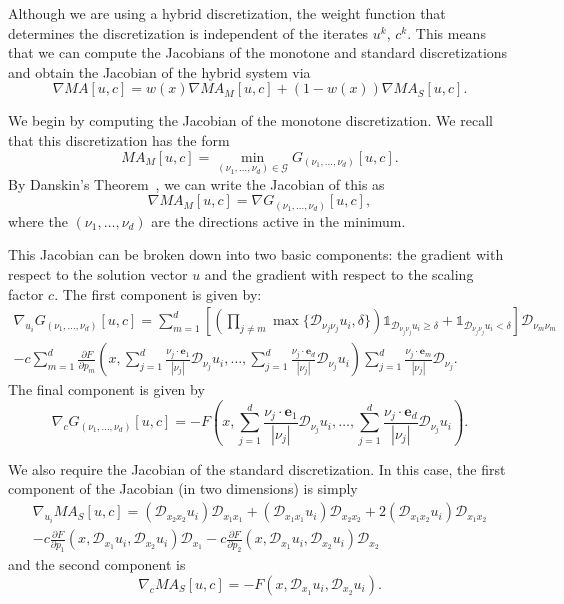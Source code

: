 \documentclass{amsart}
\theoremstyle{lemma}
\theoremstyle{remark}
\begin{document}
Although we are using a hybrid discretization, the weight function that determines the discretization is independent of the iterates $u^k$, $c^k$.  This means that we can compute the Jacobians of the monotone and standard discretizations and obtain the Jacobian of the hybrid system via
\[ \nabla MA[u,c] = w(x) \nabla MA_M[u,c] + (1-w(x)) \nabla MA_S[u,c]. \]

We begin by computing the Jacobian of the monotone discretization.  We recall that this discretization has the form
\[ MA_M[u,c] = \min\limits_{(\nu_1,\ldots,\nu_d)\in{\mathcal{G}}} G_{(\nu_1,\ldots,\nu_d)}[u,c]. \]
By Danskin's Theorem~\cite{Bertsekas}, we can write the Jacobian of this as
\[ \nabla MA_M[u,c] = \nabla G_{(\nu_1,\ldots,\nu_d)}[u,c],\]
where the $(\nu_1,\ldots,\nu_d)$ are the directions active in the minimum.

This Jacobian can be broken down into two basic components: the gradient with respect to the solution vector $u$ and the gradient with respect to the scaling factor $c$.  The first component is given by:
\begin{multline*} 
\nabla_{u_i} G_{(\nu_1,\ldots,\nu_d)}[u,c] = \sum\limits_{m=1}^d\left[\left(\prod\limits_{j\neq m}\max\{{\mathcal{D}}_{\nu_j\nu_j}u_i,\delta\}\right){\mathds{1}}_{{\mathcal{D}}_{\nu_j\nu_j}u_i\geq\delta} + 
{\mathds{1}}_{{\mathcal{D}}_{\nu_j\nu_j}u_i<\delta}\right]{\mathcal{D}}_{\nu_m\nu_m}\\
 - c\sum\limits_{m=1}^d\frac{\partial F}{\partial p_m}\left(x,\sum\limits_{j=1}^d\frac{\nu_j\cdot {\mathbf{e}}_1}{{\left\vert{\nu_j}\right\vert}}{\mathcal{D}}_{\nu_j}u_i,\ldots,\sum\limits_{j=1}^d\frac{\nu_j\cdot {\mathbf{e}}_d}{{\left\vert{\nu_j}\right\vert}}{\mathcal{D}}_{\nu_j}u_i\right)
 \sum\limits_{j=1}^d\frac{\nu_j\cdot{\mathbf{e}}_m}{{\left\vert{\nu_j}\right\vert}}{\mathcal{D}}_{\nu_j}.
\end{multline*}
The final component is given by
\[ \nabla_c G_{(\nu_1,\ldots,\nu_d)}[u,c] = -F\left(x,\sum\limits_{j=1}^d\frac{\nu_j\cdot {\mathbf{e}}_1}{{\left\vert{\nu_j}\right\vert}}{\mathcal{D}}_{\nu_j}u_i,\ldots,\sum\limits_{j=1}^d\frac{\nu_j\cdot {\mathbf{e}}_d}{{\left\vert{\nu_j}\right\vert}}{\mathcal{D}}_{\nu_j}u_i\right).\]

We also require the Jacobian of the standard discretization.  In this case, the first component of the Jacobian (in two dimensions) is simply
\begin{multline*}  
\nabla_{u_i} MA_S[u,c] = ({\mathcal{D}}_{x_2x_2}u_i){\mathcal{D}}_{x_1x_1} + ({\mathcal{D}}_{x_1x_1}u_i){\mathcal{D}}_{x_2x_2} + 2({\mathcal{D}}_{x_1x_2}u_i){\mathcal{D}}_{x_1x_2} \\ 
-c\frac{\partial F}{\partial p_1}(x,{\mathcal{D}}_{x_1} u_i,{\mathcal{D}}_{x_2}u_i){\mathcal{D}}_{x_1} - c\frac{\partial F}{\partial p_2}(x,{\mathcal{D}}_{x_1} u_i,{\mathcal{D}}_{x_2}u_i){\mathcal{D}}_{x_2}
\end{multline*}
and the second component is
\[ \nabla_c MA_S[u,c] = -F(x,{\mathcal{D}}_{x_1} u_i,{\mathcal{D}}_{x_2}u_i). \]
\end{document}
